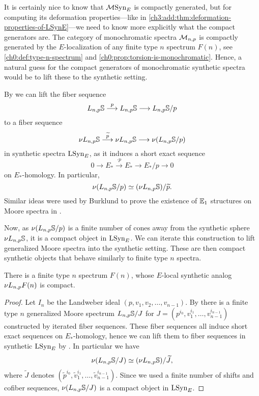 It is certainly nice to know that $\mathcal{M}\mathrm{Syn}_{E}$ is compactly generated, but for computing its deformation properties---like in \cref{ch3:add:thm:deformation-properties-of-LSynE}---we need to know more explicitly what the compact generators are. The category of monochromatic spectra $\mathcal{M}_{n,p}$ is compactly generated by the $E$-localization of any finite type $n$ spectrum $F(n)$, see \cref{ch0:def:type-n-spectrum} and \cref{ch0:prop:torsion-is-monochromatic}. Hence, a natural guess for the compact generators of monochromatic synthetic spectra would be to lift these to the synthetic setting. 

\begin{construction}
    By \cite[4.23]{pstragowski_2022} we can lift the fiber sequence 
    \[L_{n,p}\mathbb{S}\overset{p}{\longrightarrow} L_{n,p}\mathbb{S}\longrightarrow L_{n,p}\mathbb{S}/p\] 
    to a fiber sequence 
    \[\nu L_{n,p}\mathbb{S} \overset{\widetilde{p}}{\longrightarrow} \nu L_{n,p}\mathbb{S}\longrightarrow \nu (L_{n,p}\mathbb{S}/p)\] 
    in synthetic spectra $\mathrm{LSyn}_{E}$, as it induces a short exact sequence 
    \[0\to E_{*} \overset{\cdot p}\to E_{*}\to E_{*}/p\to 0\]
    on $E_{*}$-homology. In particular, 
    \[\nu (L_{n,p}\mathbb{S}/p)\simeq (\nu L_{n,p}\mathbb{S})/\widetilde{p}.\] 
    Similar ideas were used by Burklund to prove the existence of $\mathbb{E}_1$ structures on Moore spectra in \cite{burklund_2022}. 
    
    Now, as $\nu (L_{n,p}\mathbb{S}/p)$ is a finite number of cones away from the synthetic sphere $\nu L_{n,p} \mathbb{S}$, it is a compact object in $\mathrm{LSyn}_{E}$. We can iterate this construction to lift generalized Moore spectra into the synthetic setting. These are then compact synthetic objects that behave similarly to finite type $n$ spectra. 
\end{construction}

\begin{lemma}
    There is a finite type $n$ spectrum $F(n)$, whose $E$-local synthetic analog $\nu L_{n,p} F(n)$ is compact. 
\end{lemma}
\begin{proof}
    Let $I_n$ be the Landweber ideal $(p,v_1, v_2, \ldots, v_{n-1})$. By \cite[4.14]{hovey-strickland_99} there is a finite type $n$ generalized Moore spectrum $L_{n,p}\mathbb{S}/J$ for $J=(p^{i_0}, v_1^{i_1}, \ldots, v_{n-1}^{i_{n-1}})$ constructed by iterated fiber sequences. These fiber sequences all induce short exact sequences on $E_{*}$-homology, hence we can lift them to fiber sequences in synthetic $\mathrm{LSyn}_{E}$ by \cite[4.23]{pstragowski_2022}. In particular we have 
    \[\nu (L_{n,p}\mathbb{S}/J) \simeq (\nu L_{n,p}\mathbb{S})/\widetilde{J},\] 
    where $\widetilde{J}$ denotes $(\widetilde{p}^{i_0}, \widetilde{v}_1^{i_1}, \ldots, \widetilde{v}_{n-1}^{i_{n-1}})$. Since we used a finite number of shifts and cofiber sequences, $\nu (L_{n,p}\mathbb{S}/J)$ is a compact object in $\mathrm{LSyn}_{E}$. 
\end{proof}

